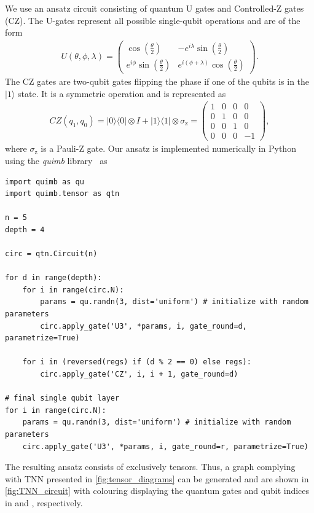 We use an ansatz circuit consisting of quantum U gates and Controlled-Z gates (CZ). The U-gates represent all possible single-qubit operations and are of the form
\begin{align}
    U(\theta, \phi, \lambda) =
            \begin{pmatrix}
                \cos\left(\frac{\theta}{2}\right)          & -e^{i\lambda}\sin\left(\frac{\theta}{2}\right) \\
                e^{i\phi}\sin\left(\frac{\theta}{2}\right) & e^{i(\phi+\lambda)}\cos\left(\frac{\theta}{2}\right)
            \end{pmatrix}
            .
\end{align}
The CZ gates are two-qubit gates flipping the phase if one of the qubits is in the $|1\rangle$ state. It is a symmetric operation and is represented as
\begin{align}
    CZ(q_1, q_0)=
        |0\rangle\langle 0| \otimes I + |1\rangle\langle 1| \otimes \sigma_\text{z} =
        \begin{pmatrix}
            1 & 0 & 0 & 0 \\
            0 & 1 & 0 & 0 \\
            0 & 0 & 1 & 0 \\
            0 & 0 & 0 & -1
        \end{pmatrix}
        ,
\end{align}
where $\sigma_\text{z}$ is a Pauli-Z gate.
Our ansatz is implemented numerically in Python using the \emph{quimb} library~\cite{Gray2018} as
\begin{verbatim}
import quimb as qu
import quimb.tensor as qtn

n = 5
depth = 4

circ = qtn.Circuit(n)

for d in range(depth):
    for i in range(circ.N):
        params = qu.randn(3, dist='uniform') # initialize with random parameters
        circ.apply_gate('U3', *params, i, gate_round=d, parametrize=True)

    for i in (reversed(regs) if (d % 2 == 0) else regs):
        circ.apply_gate('CZ', i, i + 1, gate_round=d)

# final single qubit layer
for i in range(circ.N):
    params = qu.randn(3, dist='uniform') # initialize with random parameters
    circ.apply_gate('U3', *params, i, gate_round=r, parametrize=True)
\end{verbatim}
The resulting ansatz consists of exclusively tensors. Thus, a graph complying with TNN presented in \cref{fig:tensor_diagrams} can be generated and are shown in \cref{fig:TNN_circuit} with colouring displaying the quantum gates and qubit indices in \protect{} and \protect{}, respectively.
